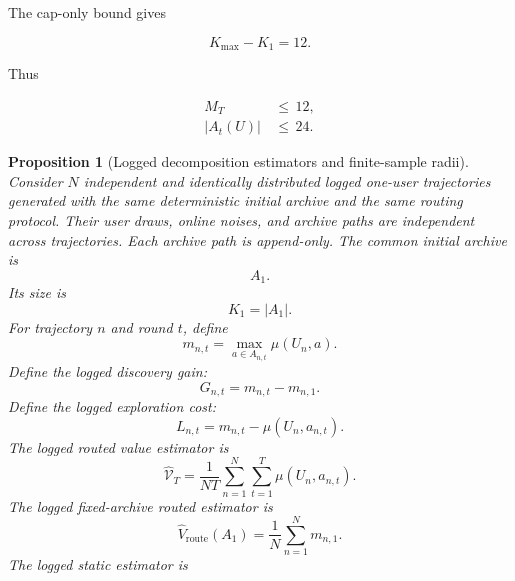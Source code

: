 \documentclass{article} %
\newtheorem{proposition}[theorem]{Proposition}
\begin{document}
The cap-only bound gives

\begin{equation}
\label{eq:app-six-cooldown-example-cap}
K_{\max}-K_1=12.
\end{equation}

Thus

\begin{align}
\label{eq:app-six-cooldown-example-final}
M_T
&\,\le\,
12,
\\
|A_t(U)|
&\,\le\,
24.
\end{align}

\begin{proposition}[Logged decomposition estimators and finite-sample radii]
\label{prop:16}
Consider \(N\) independent and identically distributed logged one-user
trajectories generated with the same deterministic initial archive and the
same routing protocol. Their user draws, online noises, and archive paths are
independent across trajectories. Each archive path is append-only. The common initial archive is
\begin{equation}
\label{eq:app-six-logged-A1}
A_1.
\end{equation}
Its size is
\begin{equation}
\label{eq:app-six-logged-K1}
K_1=|A_1|.
\end{equation}
For trajectory \(n\) and round \(t\), define
\begin{equation}
\label{eq:app-six-logged-m}
m_{n,t}
=
\max_{a\in A_{n,t}}\mu(U_n,a).
\end{equation}
Define the logged discovery gain:
\begin{equation}
\label{eq:app-six-logged-G}
G_{n,t}
=
m_{n,t}-m_{n,1}.
\end{equation}
Define the logged exploration cost:
\begin{equation}
\label{eq:app-six-logged-L}
L_{n,t}
=
m_{n,t}-\mu(U_n,a_{n,t}).
\end{equation}
The logged routed value estimator is
\begin{equation}
\label{eq:app-six-hat-value}
\widehat{\mathcal{V}}_T
=
\frac{1}{NT}\sum_{n=1}^{N}\sum_{t=1}^{T}
\mu(U_n,a_{n,t}).
\end{equation}
The logged fixed-archive routed estimator is
\begin{equation}
\label{eq:app-six-hat-route}
\widehat V_{\mathrm{route}}(A_1)
=
\frac{1}{N}\sum_{n=1}^{N}m_{n,1}.
\end{equation}
The logged static estimator is
\begin{equation}

\end{equation}
\end{proposition}
\end{document}
